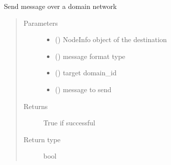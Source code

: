\documentclass[letterpaper,10pt,english]{sphinxmanual}
\begin{document}
\begin{fulllineitems}
\begin{fulllineitems}
\end{fulllineitems}


\begin{fulllineitems}
\label{\detokenize{bbc1.core.bbc_network:bbc1.core.bbc_network.BBcNetwork.send_message_in_network}}
Send message over a domain network
\begin{quote}\begin{description}
\item[{Parameters}] \leavevmode\begin{itemize}
\item {} 
 () \textendash{} NodeInfo object of the destination

\item {} 
 () \textendash{} message format type

\item {} 
 () \textendash{} target domain\_id

\item {} 
 () \textendash{} message to send

\end{itemize}

\item[{Returns}] \leavevmode
True if successful

\item[{Return type}] \leavevmode
bool

\end{description}\end{quote}

\end{fulllineitems}



\end{fulllineitems}
\end{document}
